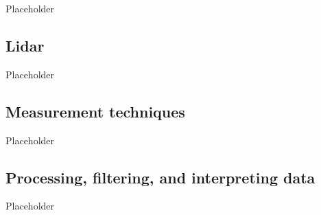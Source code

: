Placeholder


\clearpage
\subsection{Lidar}
\label{sec:intro_lidar}

Placeholder


\clearpage
\subsection{Measurement techniques}
\label{sec:intro_meas_tech}

Placeholder


\clearpage
\subsection{Processing, filtering, and interpreting data}
\label{sec:intro_rs_data}

Placeholder

\clearpage